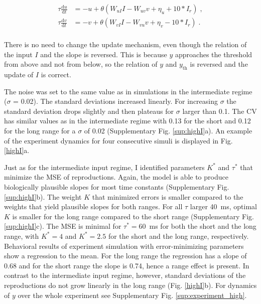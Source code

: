 \documentclass[10pt]{article}
\begin{document}
\begin{equation} \label{EqhighI}
	\begin{split}
	\tau\frac{\text{d}u}{\text{d}t} & = -u + \theta(W_{uI}I - W_{uv}v + \eta_u + 10*I_r) \;,\\
	\tau\frac{\text{d}v}{\text{d}t} & = -v + \theta(W_{vI}I - W_{vu}v + \eta_v - 10*I_r) \;.\\
	\end{split}
\end{equation}

There is no need to change the update mechanism, even though the relation of the input $I$ and the slope is reversed. This is because $y$ approaches the threshold from above and not from below, so the relation of $y$ and $y_{\text{th}}$ is reversed and the update of $I$ is correct. 

The noise was set to the same value as in simulations in the intermediate regime ($\sigma$ = 0.02). The standard deviations increased linearly. For increasing $\sigma$ the standard deviation drops slightly and then plateaus for $\sigma$ larger than 0.1. The CV has similar values as in the intermediate regime with 0.13 for the short and 0.12 for the long range for a $\sigma$ of 0.02 (Supplementary Fig. \ref{sup:highI}a). 
An example of the experiment dynamics for four consecutive simuli is displayed in Fig. \ref{highI}a.

Just as for the intermediate input regime, I identified parameters $K^*$ and $\tau^*$ that minimize the MSE of reproductions. 
Again, the model is able to produce biologically plausible slopes for most time constants (Supplementary Fig. \ref{sup:highI}b). The weight $K$ that minimized errors is smaller compared to the weights that yield plausible slopes for both ranges. 
For all $\tau$ larger 40~ms, optimal $K$ is smaller for the long range compared to the short range (Supplementary Fig. \ref{sup:highI}c).
The MSE is minimal for $\tau^* = 60$~ms for both the short and the long range, with $K^* = 4$ and $K^* = 2.5$  for the short and the long range, respectively. 
Behavioral results of experiment simulation with error-minimizing parameters show a regression to the mean.
For the long range the regression has a slope of 0.68 and for the short range the slope is 0.74, hence a range effect is present.
In contrast to the intermediate input regime, however, standard deviations of the reproductions do not grow linearly in the long range (Fig. \ref{highI}b).
For dynamics of $y$ over the whole experiment see Supplementary Fig. \ref{sup:experiment_high}.
\end{document}
